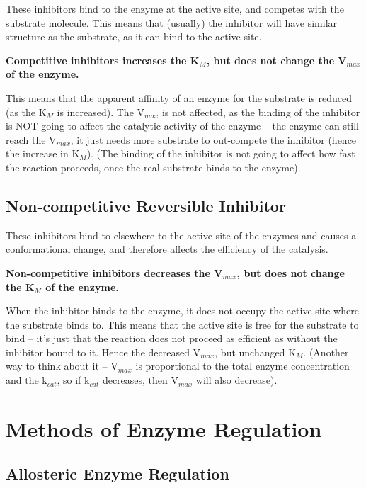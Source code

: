 These inhibitors bind to the enzyme at the active site, and competes with the substrate molecule.
This means that (usually) the inhibitor will have similar structure as the substrate, as it can bind to the active site.

\begin{center}
\textbf{Competitive inhibitors increases the K$_M$, but does not change the V$_{max}$ of the enzyme.}
\end{center}

This means that the apparent affinity of an enzyme for the substrate is reduced (as the K$_M$ is increased).
The V$_{max}$ is not affected, as the binding of the inhibitor is NOT going to affect the catalytic activity of the enzyme -- the enzyme can still reach the V$_{max}$, it just needs more substrate to out-compete the inhibitor (hence the increase in K$_M$).
(The binding of the inhibitor is not going to affect how fast the reaction proceeds, once the real substrate binds to the enzyme).

\subsection{Non-competitive Reversible Inhibitor}

These inhibitors bind to elsewhere to the active site of the enzymes and causes a conformational change, and therefore affects the efficiency of the catalysis.

\begin{center}
\textbf{Non-competitive inhibitors decreases the V$_{max}$, but does not change the K$_M$ of the enzyme.}
\end{center}

When the inhibitor binds to the enzyme, it does not occupy the active site where the substrate binds to.
This means that the active site is free for the substrate to bind -- it's just that the reaction does not proceed as efficient as without the inhibitor bound to it.
Hence the decreased V$_{max}$, but unchanged K$_M$.
(Another way to think about it -- V$_{max}$ is proportional to the total enzyme concentration and the k$_{cat}$, so if k$_{cat}$ decreases, then V$_{max}$ will also decrease).

\section{Methods of Enzyme Regulation}

\subsection{Allosteric Enzyme Regulation}

